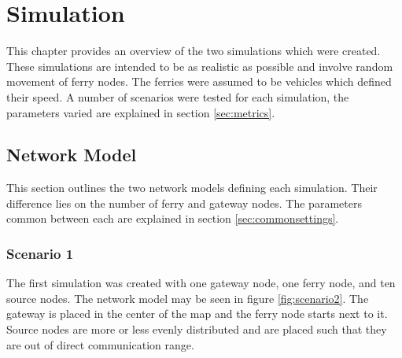 \chapter{Simulation}


This chapter provides an overview of the two simulations which were created.
These simulations are intended to be as realistic as possible and involve random movement of ferry nodes.
The ferries were assumed to be vehicles which defined their speed.
A number of scenarios were tested for each simulation, the parameters varied are explained in section \ref{sec:metrics}.


\section{Network Model}
\label{sec:main_net_model}

This section outlines the two network models defining each simulation. 
Their difference lies on the number of ferry and gateway nodes.
The parameters common between each are explained in section \ref{sec:commonsettings}.

\subsection{Scenario 1}		%

The first simulation was created with one gateway node, one ferry node, and ten source nodes.
The network model may be seen in figure \ref{fig:scenario2}.
The gateway is placed in the center of the map and the ferry node starts next to it.
Source nodes are more or less evenly distributed and are placed such that they are out of direct communication range.

